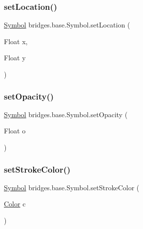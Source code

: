 \mbox{\label{classbridges_1_1base_1_1_symbol_a7d02e54c0cdfcaa7cb26176474207e39}} 
\subsubsection{\texorpdfstring{setLocation()}{setLocation()}\hspace{0.1cm}{\footnotesize\ttfamily [2/2]}}
{\footnotesize\ttfamily \mbox{\hyperlink{classbridges_1_1base_1_1_symbol}{Symbol}} bridges.\+base.\+Symbol.\+set\+Location (\begin{DoxyParamCaption}\item[{Float}]{x,  }\item[{Float}]{y }\end{DoxyParamCaption})}

\mbox{\label{classbridges_1_1base_1_1_symbol_a1a0bf2838187440b3cf4b2a656eb3620}} 
\subsubsection{\texorpdfstring{setOpacity()}{setOpacity()}}
{\footnotesize\ttfamily \mbox{\hyperlink{classbridges_1_1base_1_1_symbol}{Symbol}} bridges.\+base.\+Symbol.\+set\+Opacity (\begin{DoxyParamCaption}\item[{Float}]{o }\end{DoxyParamCaption})}

\mbox{\label{classbridges_1_1base_1_1_symbol_a10abfbf4651ffdc630121da84e23b116}} 
\subsubsection{\texorpdfstring{setStrokeColor()}{setStrokeColor()}}
{\footnotesize\ttfamily \mbox{\hyperlink{classbridges_1_1base_1_1_symbol}{Symbol}} bridges.\+base.\+Symbol.\+set\+Stroke\+Color (\begin{DoxyParamCaption}\item[{\mbox{\hyperlink{classbridges_1_1base_1_1_color}{Color}}}]{c }\end{DoxyParamCaption})}

